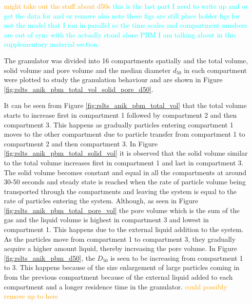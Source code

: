 \textcolor{orange}{might take out the stuff about d50s}
\textcolor{cyan}{this is the last part I need to write up and or get the data for and or remove}
\textcolor{cyan}{also note these figs are still place holder figs for not the model that I ran in parallel so the time scales and compartment numbers are out of sync with the actually stand alone PBM I am talking about in this supplementary material section.}
\par The granulator was divided into 16 compartments spatially and the total volume, solid volume and pore volume and the median diameter $d_50$ in each compartment were plotted to study the granulation behaviour and are shown in Figure \ref{fig:rslts_anik_pbm_total_vol_solid_pore_d50}.


\par It can be seen from Figure \ref{fig:rslts_anik_pbm_total_vol} that the total volume starts to increase first in compartment 1 followed by compartment 2 and then compartment 3. This happens as gradually particles entering compartment 1 moves to the other compartment due to particle transfer from compartment 1 to compartment 2 and then compartment 3. In Figure \ref{fig:rslts_anik_pbm_total_solid_vol} it is observed that the solid volume similar to the total volume increases first in compartment 1 and last in compartment 3. The solid volume becomes constant and equal in all the compartments at around 30-50 seconds and steady state is reached when the rate of particle volume being transported through the compartments and leaving the system is equal to the rate of particles entering the system. Although, as seen in Figure \ref{fig:rslts_anik_pbm_total_pore_vol} the pore volume which is the sum of the gas and the liquid volume is highest in compartment 3 and lowest in compartment 1. This happens due to the external liquid addition to the system. As the particles move from compartment 1 to compartment 3, they gradually acquire a higher amount liquid, thereby increasing the pore volume. In Figure \ref{fig:rslts_anik_pbm_d50}, the $D_50$ is seen to be increasing from compartment 1 to 3. This happens because of the size enlargement of large particles coming in from the previous compartment because of the external liquid added to each compartment and a longer residence time in the granulator.
\textcolor{orange}{could possibly remove up to here}


